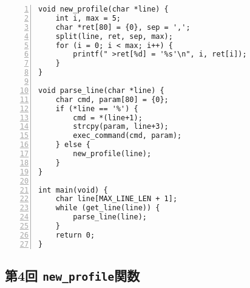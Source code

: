 \documentclass[autodetect-engine,dvi=dvipdfmx,ja=standard,
               a4j,11pt]{bxjsarticle}
\begin{document}
\begin{Verbatim}[numbers=left, xleftmargin=10mm, numbersep=6pt,
    fontsize=\small, baselinestretch=0.8]
void new_profile(char *line) {
    int i, max = 5;
    char *ret[80] = {0}, sep = ',';
    split(line, ret, sep, max);
    for (i = 0; i < max; i++) {
        printf(" >ret[%d] = '%s'\n", i, ret[i]);
    }
}

void parse_line(char *line) {
    char cmd, param[80] = {0};
    if (*line == '%') {
        cmd = *(line+1);
        strcpy(param, line+3);
        exec_command(cmd, param);
    } else {
        new_profile(line);
    }
}

int main(void) {
    char line[MAX_LINE_LEN + 1];
    while (get_line(line)) {
        parse_line(line);
    }
    return 0;
}
\end{Verbatim}

\subsection{第4回 \texttt{new\_profile}関数} \label{code:4}
\end{document}
